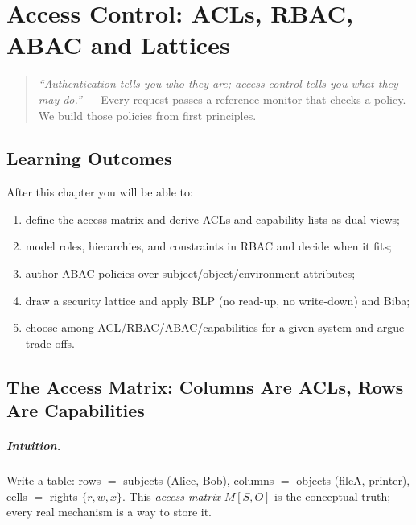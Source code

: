 \chapter{Access Control: ACLs, RBAC, ABAC and Lattices}
\label{ch:access}

\begin{quote}
\emph{``Authentication tells you who they are; access control tells you what they may do.''} --- Every request passes a reference monitor that checks a policy. We build those policies from first principles.
\end{quote}

\noindent{}
\vspace{0.4em}

\section*{Learning Outcomes}
After this chapter you will be able to:
\begin{enumerate}[label=(L\arabic*)]
    \item define the access matrix and derive ACLs and capability lists as dual views;
    \item model roles, hierarchies, and constraints in RBAC and decide when it fits;
    \item author ABAC policies over subject/object/environment attributes;
    \item draw a security lattice and apply BLP (no read-up, no write-down) and Biba;
    \item choose among ACL/RBAC/ABAC/capabilities for a given system and argue trade-offs.
\end{enumerate}

\section{The Access Matrix: Columns Are ACLs, Rows Are Capabilities}
\label{sec:matrix}
\paragraph{Intuition.} Write a table: rows $=$ subjects (Alice, Bob), columns $=$ objects (fileA, printer), cells $=$ rights $\{r,w,x\}$. This \emph{access matrix} $M[S,O]$ is the conceptual truth; every real mechanism is a way to store it.

